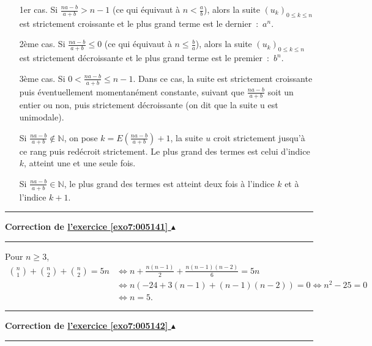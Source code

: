 \documentclass[11pt,a4paper]{article}
\newcommand{\Nn}{\mathbb{N}} \newcommand{\N}{\mathbb{N}}
\newcounter{exo}
\newcommand{\correction}[1]{\hypertarget{cor7:#1}{}\label{cor7:#1}{\bf Correction de \hyperlink{exo7:#1}{l'exercice \ref{exo7:#1} $\blacktriangle$}}\vspace{1mm}\hrule\vspace{1mm}}
\newcommand{\fincorrection}{\vspace{1mm}\hrule\vspace*{7mm}}
\begin{document}
\begin{itemize}
\item[1er cas.] Si $\frac{na-b}{a+b}>n-1$ (ce qui équivaut à $n<\frac{a}{b}$), alors la suite $(u_k)_{0\leq k\leq n}$
est strictement croissante et le plus grand terme est le dernier~:~$a^n$.

\item[2ème cas.] Si $\frac{na-b}{a+b}\leq0$ (ce qui équivaut à $n\leq\frac{b}{a}$), alors la suite $(u_k)_{0\leq k\leq
n}$ est strictement décroissante et le plus grand terme est le premier~:~$b^n$.

\item[3ème cas.] Si $0<\frac{na-b}{a+b}\leq n-1$. Dans ce cas, la suite est strictement croissante puis éventuellement
momentanément constante, suivant que $\frac{na-b}{a+b}$ soit un entier ou non, puis strictement décroissante (on dit
que la suite u est unimodale).

Si $\frac{na-b}{a+b}\notin\Nn$, on pose $k=E(\frac{na-b}{a+b})+1$, la suite $u$ croit strictement jusqu'à ce rang
puis redécroit strictement. Le plus grand des termes est celui d'indice $k$, atteint une et une seule fois.

Si $\frac{na-b}{a+b}\in\Nn$, le plus grand des termes est atteint deux fois à l'indice $k$ et à l'indice $k+1$.
\end{itemize}
\fincorrection
\correction{005141}
Pour $n\geq3$,
\begin{align*}
\binom{n}{1}+\binom{n}{2}+\binom{n}{2}=5n&\Leftrightarrow n+\frac{n(n-1)}{2}+\frac{n(n-1)(n-2)}{6}=5n\\
 &\Leftrightarrow n(-24+3(n-1)+(n-1)(n-2))=0\Leftrightarrow n^2-25=0\\
 &\Leftrightarrow n=5.
\end{align*}
\fincorrection
\correction{005142}
\end{document}
